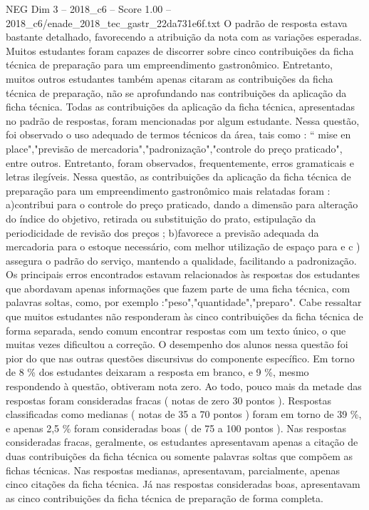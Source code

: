 \begin{textsample}{NEG Dim 3 – 2018\_c6 – Score 1.00 – 2018\_c6/enade\_2018\_tec\_gastr\_22da731e6f.txt}
O padrão de resposta estava bastante detalhado, favorecendo a atribuição da nota com as variações esperadas.
Muitos estudantes foram capazes de discorrer sobre cinco contribuições da ficha técnica de preparação para um empreendimento gastronômico.
Entretanto, muitos outros estudantes também apenas citaram as contribuições da ficha técnica de preparação, não se aprofundando nas contribuições da aplicação da ficha técnica.
Todas as contribuições da aplicação da ficha técnica, apresentadas no padrão de respostas, foram mencionadas por algum estudante.
Nessa questão, foi observado o uso adequado de termos técnicos da área, tais como : “ mise en place","previsão de mercadoria","padronização","controle do preço praticado", entre outros.
Entretanto, foram observados, frequentemente, erros gramaticais e letras ilegíveis.
Nessa questão, as contribuições da aplicação da ficha técnica de preparação para um empreendimento gastronômico mais relatadas foram : a)contribui para o controle do preço praticado, dando a dimensão para alteração do índice do objetivo, retirada ou substituição do prato, estipulação da periodicidade de revisão dos preços ; b)favorece a previsão adequada da mercadoria para o estoque necessário, com melhor utilização de espaço para e c ) assegura o padrão do serviço, mantendo a qualidade, facilitando a padronização.
Os principais erros encontrados estavam relacionados às respostas dos estudantes que abordavam apenas informações que fazem parte de uma ficha técnica, com palavras soltas, como, por exemplo :"peso","quantidade","preparo".
Cabe ressaltar que muitos estudantes não responderam às cinco contribuições da ficha técnica de forma separada, sendo comum encontrar respostas com um texto único, o que muitas vezes dificultou a correção.
O desempenho dos alunos nessa questão foi pior do que nas outras questões discursivas do componente específico.
Em torno de 8 \% dos estudantes deixaram a resposta em branco, e 9 \%, mesmo respondendo à questão, obtiveram nota zero.
Ao todo, pouco mais da metade das respostas foram consideradas fracas ( notas de zero 30 pontos ).
Respostas classificadas como medianas ( notas de 35 a 70 pontos ) foram em torno de 39 \%, e apenas 2,5 \% foram consideradas boas ( de 75 a 100 pontos ).
Nas respostas consideradas fracas, geralmente, os estudantes apresentavam apenas a citação de duas contribuições da ficha técnica ou somente palavras soltas que compõem as fichas técnicas.
Nas respostas medianas, apresentavam, parcialmente, apenas cinco citações da ficha técnica.
Já nas respostas consideradas boas, apresentavam as cinco contribuições da ficha técnica de preparação de forma completa.

\end{textsample}
